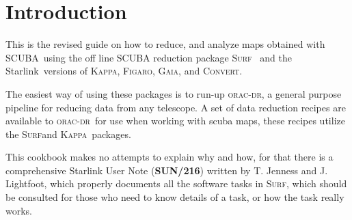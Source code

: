\documentclass[twoside,11pt]{article}
\newcommand{\stardocinitials}  {SC}
\newcommand{\stardocnumber}    {11.2}
\newcommand{\stardocabstract}  {[Text of abstract]}
\newcommand{\scuba}{\htmladdnormallink{SCUBA}{http://www.jach.hawaii.edu/JCMT/}}
\newcommand{\starlink}{\htmladdnormallink{Starlink}{http://www.starlink.ac.uk/}}
\newcommand{\Kappa}{\xref{\textsc{Kappa}}{sun95}{}}
\newcommand{\Figaro}{\xref{\textsc{Figaro}}{sun86}{}}
\newcommand{\gaia}{\xref{\textsc{Gaia}}{sun214}{}}
\newcommand{\convert}{\xref{\textsc{Convert}}{sun55}{}}
\newcommand{\surf}{\xref{\textsc{Surf}}{sun216}{}}
\newcommand{\oracdr}{\xref{\textsc{orac-dr}}{sun231}{}}
\newcommand{\stardocname}{\stardocinitials /\stardocnumber}
\newcommand{\htmladdnormallink}[2]{#1}
\newenvironment{latexonly}{}{}
\newcommand{\xref}[3]{#1}
\newcommand{\xlabel}[1]{}
\renewcommand{\_}{\texttt{\symbol{95}}}
\renewcommand{\thepage}{\roman{page}}
\begin{document}
\begin{htmlonly}
\end{htmlonly}





  \newpage
  \begin{latexonly}
    \setlength{\parskip}{0mm}
    \tableofcontents
    \setlength{\parskip}{\medskipamount}
    \markboth{\stardocname}{\stardocname}
  \end{latexonly}


\cleardoublepage
\renewcommand{\thepage}{\arabic{page}}
\setcounter{page}{1}


\section{\xlabel{introduction}Introduction}

This is the revised guide on how to reduce, and analyze maps obtained
with \scuba\ using the off line SCUBA reduction package \surf\
\cite{surf} and the \starlink\ versions of \Kappa \cite{kappa},
\Figaro \cite{figaro}, \gaia \cite{gaia}, and \convert \cite{convert}.


The easiest way of using these packages is to run-up \oracdr, a
general purpose pipeline for reducing data from any telescope.  A set
of data reduction recipes are available to \oracdr\ for use when
working with scuba maps, these recipes utilize the \surf and \Kappa\ packages.


This cookbook makes no attempts to explain why and how, for that there
is a comprehensive Starlink User Note
(\xref{\textbf{SUN/216}}{sun216}{}) written by T. Jenness and J.
Lightfoot, which properly documents all the software tasks in \surf,
which should be consulted for those who need to know details of a
task, or how the task really works.
\end{document}
